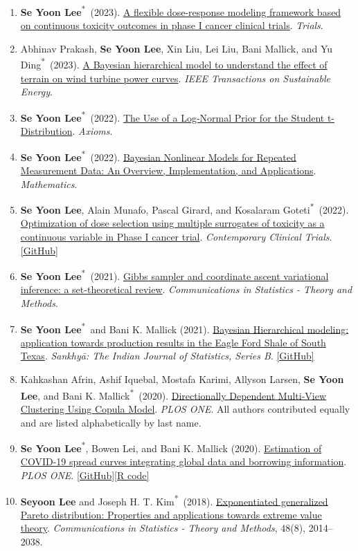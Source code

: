 \documentclass[11pt,letterpaper]{article}
\newcommand{\me}{\textbf{Se Yoon Lee}}
\newcommand{\corr}{\textsuperscript{*}}
\begin{document}
\begin{enumerate}
\item \me\corr\ (2023). \href{https://doi.org/10.1186/s13063-023-07793-0}{A flexible dose-response modeling framework based on continuous toxicity outcomes in phase I cancer clinical trials}. \textit{Trials}.
\item Abhinav Prakash, \me, Xin Liu, Lei Liu, Bani Mallick, and Yu Ding\corr\ (2023). \href{https://ieeexplore.ieee.org/document/10301539}{A Bayesian hierarchical model to understand the effect of terrain on wind turbine power curves}. \textit{IEEE Transactions on Sustainable Energy}.
\item \me\corr\ (2022). \href{https://www.mdpi.com/2075-1680/11/9/462}{The Use of a Log-Normal Prior for the Student t-Distribution}. \textit{Axioms}.
\item \me\corr\ (2022). \href{https://www.mdpi.com/2227-7390/10/6/898}{Bayesian Nonlinear Models for Repeated Measurement Data: An Overview, Implementation, and Applications}. \textit{Mathematics}.
\item \me, Alain Munafo, Pascal Girard, and Kosalaram Goteti\corr\ (2022). \href{https://www.sciencedirect.com/science/article/pii/S1551714421003931}{Optimization of dose selection using multiple surrogates of toxicity as a continuous variable in Phase I cancer trial}. \textit{Contemporary Clinical Trials}. \href{https://github.com/yain22/2PLD}{[GitHub]}
\item \me\corr\ (2021). \href{https://doi.org/10.1080/03610926.2021.1921214}{Gibbs sampler and coordinate ascent variational inference: a set-theoretical review}. \textit{Communications in Statistics - Theory and Methods}.
\item \me\corr\ and Bani K. Mallick (2021). \href{https://rdcu.be/ceg4p}{Bayesian Hierarchical modeling: application towards production results in the Eagle Ford Shale of South Texas}. \textit{Sankhy\={a}: The Indian Journal of Statistics, Series B}. \href{https://github.com/yain22/SWM}{[GitHub]}
\item Kahkashan Afrin, Ashif Iquebal, Mostafa Karimi, Allyson Larsen, \me, and Bani K. Mallick\corr\ (2020). \href{https://journals.plos.org/plosone/article?id=10.1371/journal.pone.0238996}{Directionally Dependent Multi-View Clustering Using Copula Model}. \textit{PLOS ONE}. All authors contributed equally and are listed alphabetically by last name.
\item \me\corr, Bowen Lei, and Bani K. Mallick (2020). \href{https://journals.plos.org/plosone/article?id=10.1371/journal.pone.0236860}{Estimation of COVID-19 spread curves integrating global data and borrowing information}. \textit{PLOS ONE}. \href{https://github.com/StevenBoys/BHRM}{[GitHub]}\enspace\href{http://www.plosone.org/article/fetchSingleRepresentation.action?uri=info:doi/10.1371/journal.pone.0236860.s005}{[R code]}
\item \textbf{Seyoon Lee} and Joseph H. T. Kim\corr\ (2018). \href{https://www.tandfonline.com/doi/pdf/10.1080/03610926.2018.1441418?needAccess=true}{Exponentiated generalized Pareto distribution: Properties and applications towards extreme value theory}. \textit{Communications in Statistics - Theory and Methods}, 48(8), 2014--2038.
\end{enumerate}
\end{document}

